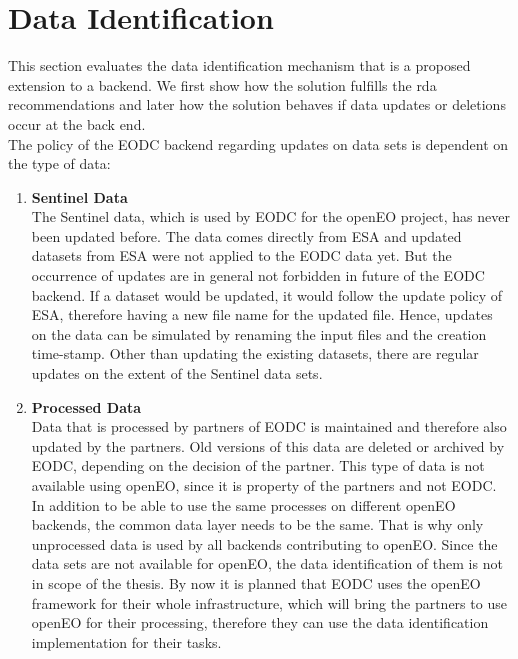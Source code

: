 \documentclass[draft,final]{vutinfth} %
\begin{document}

\section{Data Identification}\label{Evaluation:special_dataid}
This section evaluates the data identification mechanism that is a proposed extension to a backend. We first show how the solution fulfills the \acrshort{rda} recommendations and later how the solution behaves if data updates or deletions occur at the back end.\\  
The policy of the EODC backend regarding updates on data sets is dependent on the type of data:

\begin{enumerate}
	\item \textbf{Sentinel Data} \\
	The Sentinel data, which is used by EODC for the openEO project, has never been updated before. The data comes directly from ESA and updated datasets from ESA were not applied to the EODC data yet. But the occurrence of updates are in general not forbidden in future of the EODC backend. If a dataset would be updated, it would follow the update policy of ESA, therefore having a new file name for the updated file. Hence, updates on the data can be simulated by renaming the input files and the creation time-stamp. Other than updating the existing datasets, there are regular updates on the extent of the Sentinel data sets.  
	\item \textbf{Processed Data} \\
	Data that is processed by partners of EODC is maintained and therefore also updated by the partners. Old versions of this data are deleted or archived by EODC, depending on the decision of the partner. This type of data is not available using openEO, since it is property of the partners and not EODC. In addition to be able to use the same processes on different openEO backends, the common data layer needs to be the same. That is why only unprocessed data is used by all backends contributing to openEO. Since the data sets are not available for openEO, the data identification of them is not in scope of the thesis. By now it is planned that EODC uses the openEO framework for their whole infrastructure, which will bring the partners to use openEO for their processing, therefore they can use the data identification implementation for their tasks.
\end{enumerate}
\end{document}

